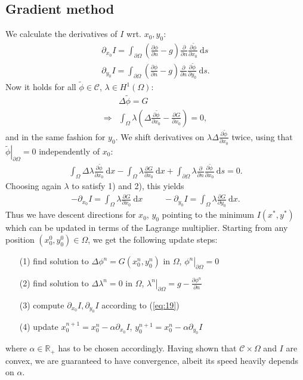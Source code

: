 \subsection{Gradient method}
We calculate the derivatives of $I$ wrt. $x_0,y_0$:
\begin{align}\label{eq:14}
	\partial_{x_0} I = \int_{\partial\Omega}
		\left(
			\frac{\partial\phi}{\partial n} - g
		\right)
		\frac{\partial}{\partial n}\frac{\partial\widetilde{\phi}}{\partial x_0}
	\:\mathrm{d}s\\
		\partial_{y_0} I = \int_{\partial\Omega}
		\left(
			\frac{\partial\phi}{\partial n} - g
		\right)
		\frac{\partial}{\partial n}\frac{\partial\widetilde{\phi}}{\partial y_0}
	\:\mathrm{d}s. \label{eq:15}
\end{align}
Now it holds for all $\widetilde{\phi}\in\mathcal{C}$, $\lambda\in H^1(\Omega)$:
\begin{align}\label{eq:16}
	&\Delta\widetilde{\phi} = G\\
	\Rightarrow &\int_\Omega \lambda
		\left(\Delta\frac{\partial\widetilde{\phi}}{\partial x_0}
		-\frac{\partial G}{\partial x_0}\right)
	=0,\label{eq:17}
\end{align}
and in the same fashion for $y_0$. We shift derivatives on 
$\lambda \Delta\frac{\partial\widetilde{\phi}}{\partial x_0}$
twice, using that $\left. \widetilde{\phi}\right|_{\partial\Omega}=0$ independently of $x_0$:
\begin{align}\label{eq:18}
	\int_{\Omega}\Delta\lambda \frac{\partial\widetilde{\phi}}{\partial x_0}
	\:\mathrm{d}x
	-\int_\Omega \lambda \frac{\partial G}{\partial x_0}
	\:\mathrm{d}x
	+\int_{\partial\Omega} \lambda 
		\frac{\partial}{\partial n}\frac{\partial\widetilde{\phi}}{\partial x_0}
	\:\mathrm{d}s
	=0.
\end{align}
Choosing again $\lambda$ to satisfy 1) and 2), this yields
\begin{align}\label{eq:19}
	-\partial_{x_0}I = \int_\Omega \lambda \frac{\partial G}{\partial x_0}\:\mathrm{d}x
	\hspace{30pt}
	-\partial_{y_0}I = \int_\Omega \lambda \frac{\partial G}{\partial y_0}\:\mathrm{d}x.
\end{align}
Thus we have descent directions for $x_0$, $y_0$ pointing to the minimum $I(x^*,y^*)$ which can be updated in terms of the Lagrange multiplier. Starting from any position $(x_0^0,y_0^0)\in\Omega$, we get the following update steps:
\begin{itemize}
	\item[(1)] find solution to $\Delta\phi^n = G(x_0^n,y_0^n)$ in $\Omega$, $\left. \phi^n\right|_{\partial\Omega}=0$
	\item[(2)] find solution to $\Delta\lambda^n = 0$ in $\Omega$, $\left. \lambda^n\right|_{\partial\Omega}=g-\frac{\partial \phi^n}{\partial n}$
	\item[(3)] compute $\partial_{x_0}I, \partial_{y_0}I$ according to (\ref{eq:19})
	\item[(4)] update $x_0^{n+1}=x_0^n - \alpha\partial_{x_0}I$, $y_0^{n+1}=x_0^n - \alpha\partial_{y_0}I$
\end{itemize}
where $\alpha\in\mathbb R_+$ has to be chosen accordingly. Having shown that $\mathcal{C}\times\Omega$ and $I$ are convex, we are guaranteed to have convergence, albeit its speed heavily depends on $\alpha$.